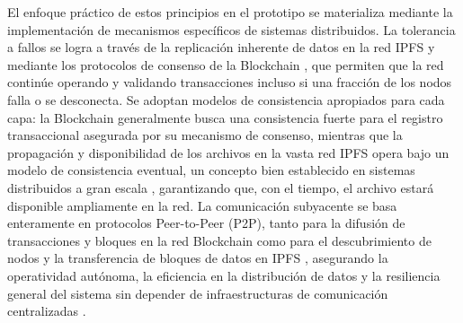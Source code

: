 El enfoque práctico de estos principios en el prototipo se materializa mediante la implementación de mecanismos específicos de sistemas distribuidos. La tolerancia a fallos se logra a través de la replicación inherente de datos en la red IPFS \parencite{benet2014ipfs} y mediante los protocolos de consenso de la Blockchain \parencite{nakamoto2008bitcoin,antonopoulos2023mastering}, que permiten que la red continúe operando y validando transacciones incluso si una fracción de los nodos falla o se desconecta. Se adoptan modelos de consistencia apropiados para cada capa: la Blockchain generalmente busca una consistencia fuerte para el registro transaccional asegurada por su mecanismo de consenso, mientras que la propagación y disponibilidad de los archivos en la vasta red IPFS opera bajo un modelo de consistencia eventual, un concepto bien establecido en sistemas distribuidos a gran escala \parencite{vogels2008eventually, vanSteen2017}, garantizando que, con el tiempo, el archivo estará disponible ampliamente en la red. La comunicación subyacente se basa enteramente en protocolos Peer-to-Peer (P2P), tanto para la difusión de transacciones y bloques en la red Blockchain \parencite{nakamoto2008bitcoin} como para el descubrimiento de nodos y la transferencia de bloques de datos en IPFS \parencite{benet2014ipfs}, asegurando la operatividad autónoma, la eficiencia en la distribución de datos y la resiliencia general del sistema sin depender de infraestructuras de comunicación centralizadas \parencite{coulouris2011}. 

